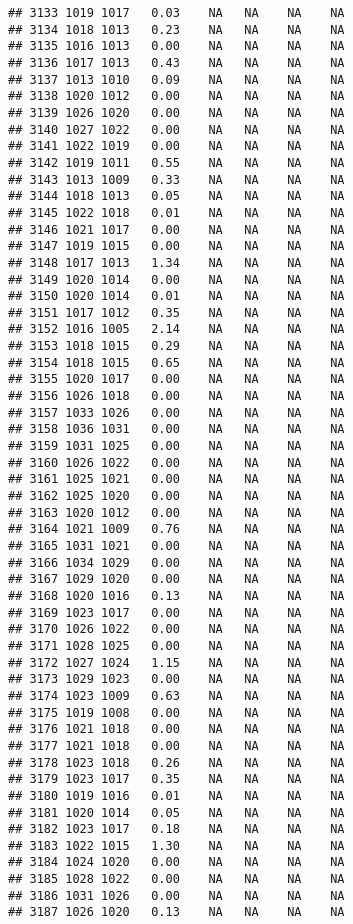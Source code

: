 \documentclass{article}\usepackage{graphicx, color}
\makeatletter
\newenvironment{kframe}{%
 \def\at@end@of@kframe{}%
 \ifinner\ifhmode%
  \def\at@end@of@kframe{\end{minipage}}%
  \begin{minipage}{\columnwidth}%
 \fi\fi%
 \def\FrameCommand##1{\hskip\@totalleftmargin \hskip-\fboxsep
 \colorbox{shadecolor}{##1}\hskip-\fboxsep
     \hskip-\linewidth \hskip-\@totalleftmargin \hskip\columnwidth}%
 \MakeFramed {\advance\hsize-\width
   \@totalleftmargin\z@ \linewidth\hsize
   \@setminipage}}%
 {\par\unskip\endMakeFramed%
 \at@end@of@kframe}
\newenvironment{knitrout}{}{} %
\makeatother
\begin{document}
\begin{knitrout}
\begin{kframe}
\begin{verbatim}
## 3133 1019 1017   0.03    NA   NA    NA    NA
## 3134 1018 1013   0.23    NA   NA    NA    NA
## 3135 1016 1013   0.00    NA   NA    NA    NA
## 3136 1017 1013   0.43    NA   NA    NA    NA
## 3137 1013 1010   0.09    NA   NA    NA    NA
## 3138 1020 1012   0.00    NA   NA    NA    NA
## 3139 1026 1020   0.00    NA   NA    NA    NA
## 3140 1027 1022   0.00    NA   NA    NA    NA
## 3141 1022 1019   0.00    NA   NA    NA    NA
## 3142 1019 1011   0.55    NA   NA    NA    NA
## 3143 1013 1009   0.33    NA   NA    NA    NA
## 3144 1018 1013   0.05    NA   NA    NA    NA
## 3145 1022 1018   0.01    NA   NA    NA    NA
## 3146 1021 1017   0.00    NA   NA    NA    NA
## 3147 1019 1015   0.00    NA   NA    NA    NA
## 3148 1017 1013   1.34    NA   NA    NA    NA
## 3149 1020 1014   0.00    NA   NA    NA    NA
## 3150 1020 1014   0.01    NA   NA    NA    NA
## 3151 1017 1012   0.35    NA   NA    NA    NA
## 3152 1016 1005   2.14    NA   NA    NA    NA
## 3153 1018 1015   0.29    NA   NA    NA    NA
## 3154 1018 1015   0.65    NA   NA    NA    NA
## 3155 1020 1017   0.00    NA   NA    NA    NA
## 3156 1026 1018   0.00    NA   NA    NA    NA
## 3157 1033 1026   0.00    NA   NA    NA    NA
## 3158 1036 1031   0.00    NA   NA    NA    NA
## 3159 1031 1025   0.00    NA   NA    NA    NA
## 3160 1026 1022   0.00    NA   NA    NA    NA
## 3161 1025 1021   0.00    NA   NA    NA    NA
## 3162 1025 1020   0.00    NA   NA    NA    NA
## 3163 1020 1012   0.00    NA   NA    NA    NA
## 3164 1021 1009   0.76    NA   NA    NA    NA
## 3165 1031 1021   0.00    NA   NA    NA    NA
## 3166 1034 1029   0.00    NA   NA    NA    NA
## 3167 1029 1020   0.00    NA   NA    NA    NA
## 3168 1020 1016   0.13    NA   NA    NA    NA
## 3169 1023 1017   0.00    NA   NA    NA    NA
## 3170 1026 1022   0.00    NA   NA    NA    NA
## 3171 1028 1025   0.00    NA   NA    NA    NA
## 3172 1027 1024   1.15    NA   NA    NA    NA
## 3173 1029 1023   0.00    NA   NA    NA    NA
## 3174 1023 1009   0.63    NA   NA    NA    NA
## 3175 1019 1008   0.00    NA   NA    NA    NA
## 3176 1021 1018   0.00    NA   NA    NA    NA
## 3177 1021 1018   0.00    NA   NA    NA    NA
## 3178 1023 1018   0.26    NA   NA    NA    NA
## 3179 1023 1017   0.35    NA   NA    NA    NA
## 3180 1019 1016   0.01    NA   NA    NA    NA
## 3181 1020 1014   0.05    NA   NA    NA    NA
## 3182 1023 1017   0.18    NA   NA    NA    NA
## 3183 1022 1015   1.30    NA   NA    NA    NA
## 3184 1024 1020   0.00    NA   NA    NA    NA
## 3185 1028 1022   0.00    NA   NA    NA    NA
## 3186 1031 1026   0.00    NA   NA    NA    NA
## 3187 1026 1020   0.13    NA   NA    NA    NA

\end{verbatim}
\end{kframe}
\end{knitrout}
\end{document}
